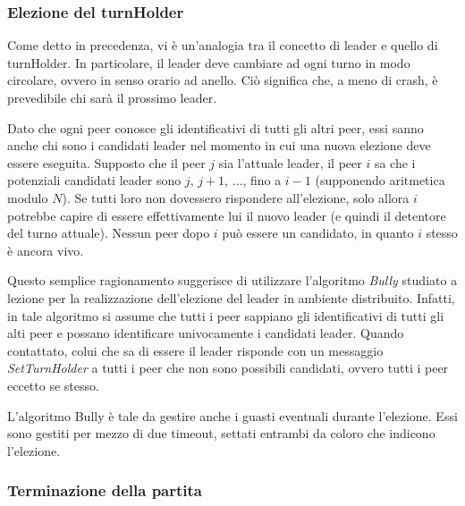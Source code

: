 \documentclass[10.5pt]{article}
\begin{document}
\subsubsection{Elezione del turnHolder}

Come detto in precedenza, vi è un'analogia tra il concetto di leader e quello di turnHolder. In particolare, il leader deve cambiare ad ogni turno in modo circolare, ovvero in senso orario ad anello. Ciò significa che, a meno di crash, è prevedibile chi sarà il prossimo leader.

Dato che ogni peer conosce gli identificativi di tutti gli altri peer, essi sanno anche chi sono i candidati leader nel momento in cui una nuova elezione deve essere eseguita. Supposto che il peer $j$ sia l'attuale leader, il peer $i$ sa che i potenziali candidati leader sono $j$, $j+1$, $\dots$, fino a $i-1$ (supponendo aritmetica modulo $N$). Se tutti loro non dovessero rispondere all'elezione, solo allora $i$ potrebbe capire di essere effettivamente lui il nuovo leader (e quindi il detentore del turno attuale). Nessun peer dopo $i$ può essere un candidato, in quanto $i$ stesso è ancora vivo.

Questo semplice ragionamento suggerisce di utilizzare l'algoritmo \emph{Bully} studiato a lezione per la realizzazione dell'elezione del leader in ambiente distribuito. Infatti, in tale algoritmo si assume che tutti i peer sappiano gli identificativi di tutti gli alti peer e possano identificare univocamente i candidati leader. Quando contattato, colui che sa di essere il leader risponde con un messaggio \emph{SetTurnHolder} a tutti i peer che non sono possibili candidati, ovvero tutti i peer eccetto se stesso.

L'algoritmo Bully è tale da gestire anche i guasti eventuali durante l'elezione. Essi sono gestiti per mezzo di due timeout, settati entrambi da coloro che indicono l'elezione.


\subsubsection{Terminazione della partita}
\end{document}
